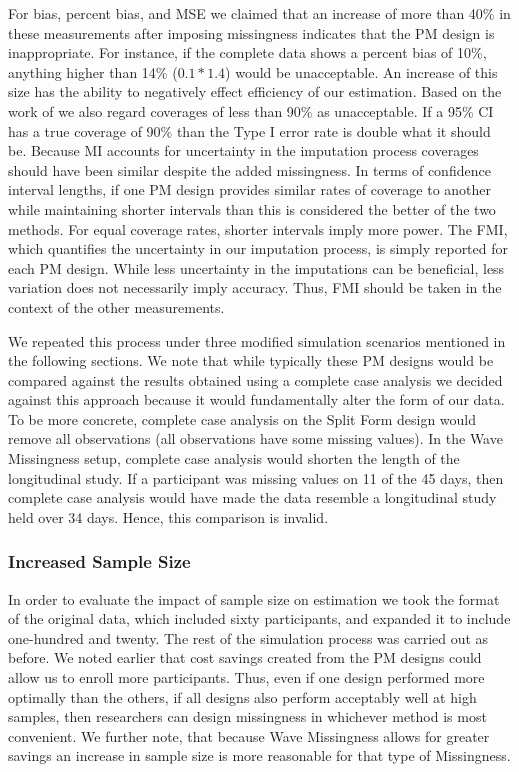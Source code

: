 \documentclass{svjour3}                     %
\begin{document}
For bias, percent bias, and MSE we claimed that an increase of more than 40\% in these measurements after imposing missingness indicates that the PM design is inappropriate. For instance, if the complete data shows a percent bias of 10\%, anything higher than 14\% ($0.1*1.4$) would be unacceptable. An increase of this size has the ability to negatively effect efficiency of our estimation. Based on the work of \citet{collins2001comparison} we also regard coverages of less than 90\% as unacceptable. If a 95\% CI has a true coverage of 90\% than the Type I error rate is double what it should be. Because MI accounts for uncertainty in the imputation process coverages should have been similar despite the added missingness. In terms of confidence interval lengths, if one PM design provides similar rates of coverage to another while maintaining shorter intervals than this is considered the better of the two methods. For equal coverage rates, shorter intervals imply more power. The FMI, which quantifies the uncertainty in our imputation process, is simply reported for each PM design. While less uncertainty in the imputations can be beneficial, less variation does not necessarily imply accuracy. Thus, FMI should be taken in the context of the other measurements. \par

We repeated this process under three modified simulation scenarios mentioned in the following sections. We note that while typically these PM designs would be compared against the results obtained using a complete case analysis \citep{rhemtulla2016asymptotic} we decided against this approach because it would fundamentally alter the form of our data. To be more concrete, complete case analysis on the Split Form design would remove all observations (all observations have some missing values). In the Wave Missingness setup, complete case analysis would shorten the length of the longitudinal study. If a participant was missing values on 11 of the 45 days, then complete case analysis would have made the data resemble a longitudinal study held over 34 days. Hence, this comparison is invalid. \par

\subsubsection{Increased Sample Size}
In order to evaluate the impact of sample size on estimation we took the format of the original data, which included sixty participants, and expanded it to include one-hundred and twenty. The rest of the simulation process was carried out as before. We noted earlier that cost savings created from the PM designs could allow us to enroll more participants. Thus, even if one design performed more optimally than the others, if all designs also perform acceptably well at high samples, then researchers can design missingness in whichever method is most convenient. We further note, that because Wave Missingness allows for greater savings an increase in sample size is more reasonable for that type of Missingness. \par
\end{document}
